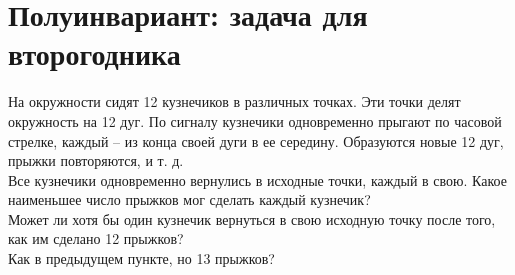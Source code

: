 
\section*{Полуинвариант: задача для второгодника}



\begin{problems}

На окружности сидят 12 кузнечиков в различных точках. Эти точки делят окружность на 12 дуг. По сигналу кузнечики одновременно прыгают по часовой стрелке, каждый – из конца своей дуги в ее середину. Образуются новые 12 дуг, прыжки повторяются, и т. д. 
\\
\sp
Все кузнечики одновременно вернулись в исходные точки, каждый в свою. Какое наименьшее число прыжков мог сделать каждый кузнечик?
\\
\sp
Может ли хотя бы один кузнечик вернуться в свою исходную точку после того, как им сделано 12 прыжков?
\\
\sp
Как в предыдущем пункте, но 13 прыжков?

\end{problems}

